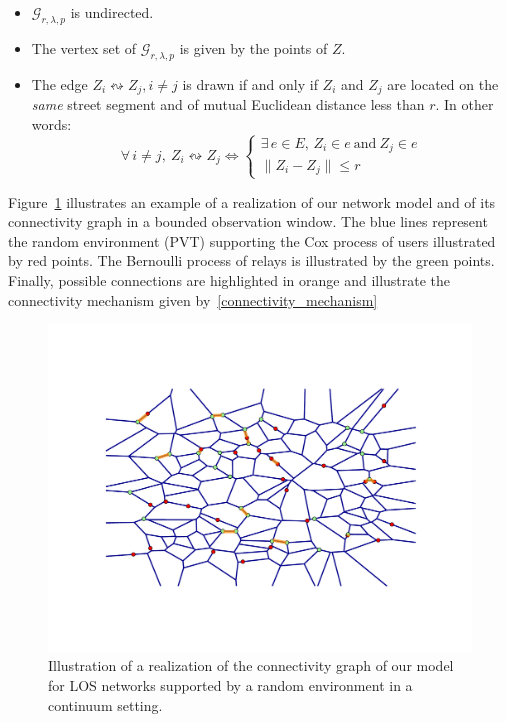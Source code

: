 \documentclass[10pt,a4paper]{amsart}
\theoremstyle{exampstyle}
\theoremstyle{exampnotations}
\begin{document}
\begin{itemize}
\item $\mathcal{G}_{r,\lambda,p}$ is undirected.
\item The vertex set of $\mathcal{G}_{r,\lambda,p}$ is given by the points of $Z$.
\item The edge $Z_{i} \leftrightsquigarrow Z_{j}, i \neq j$ is drawn if and only if $Z_{i}$ and $Z_{j}$ are located on the \emph{same} street segment and of mutual Euclidean distance less than $r$. In other words:
\begin{equation}
\label{connectivity_mechanism}
\forall \, i \neq j, \: Z_{i} \leftrightsquigarrow Z_{j} \Leftrightarrow 
\left\{
\begin{array}{l}
\exists \, e \in E, \, Z_{i} \in e  \  \text{and} \  Z_{j} \in e \\
\lVert Z_{i} - Z_{j} \rVert \leq r
\end{array}
\right.
\end{equation}
\end{itemize}
\indent Figure~\ref{fig:Network} illustrates an example of a realization of our network model and of its connectivity graph in a bounded observation window. The blue lines represent the random environment (PVT) supporting the Cox process of users illustrated by red points. The Bernoulli process of relays is illustrated by the green points. Finally, possible connections are highlighted in orange and illustrate the connectivity mechanism given by~\eqref{connectivity_mechanism}
\begin{figure}[h!]
\centering
    \includegraphics[width=\linewidth]{Network.pdf}
    \caption{Illustration of a realization of the connectivity graph of our model for LOS networks supported by a random environment in a continuum setting.}
    \label{fig:Network}
\end{figure}
\end{document}
